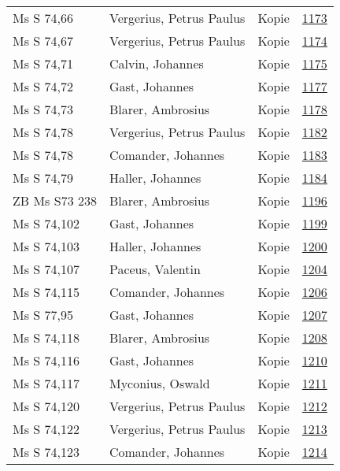 \documentclass[10pt,a4paper,landscape]{report}
\begin{document}
\begin{longtable}{p{16cm}p{4cm}lr}
Ms S 74,66	&	Vergerius, Petrus Paulus	&	Kopie	&	\href{http://130.60.24.72/assignment/1173}{1173}\\
Ms S 74,67	&	Vergerius, Petrus Paulus	&	Kopie	&	\href{http://130.60.24.72/assignment/1174}{1174}\\
Ms S 74,71	&	Calvin, Johannes	&	Kopie	&	\href{http://130.60.24.72/assignment/1175}{1175}\\
Ms S 74,72	&	Gast, Johannes	&	Kopie	&	\href{http://130.60.24.72/assignment/1177}{1177}\\
Ms S 74,73	&	Blarer, Ambrosius	&	Kopie	&	\href{http://130.60.24.72/assignment/1178}{1178}\\
Ms S 74,78	&	Vergerius, Petrus Paulus	&	Kopie	&	\href{http://130.60.24.72/assignment/1182}{1182}\\
Ms S 74,78	&	Comander, Johannes	&	Kopie	&	\href{http://130.60.24.72/assignment/1183}{1183}\\
Ms S 74,79	&	Haller, Johannes	&	Kopie	&	\href{http://130.60.24.72/assignment/1184}{1184}\\
ZB Ms S73 238	&	Blarer, Ambrosius	&	Kopie	&	\href{http://130.60.24.72/assignment/1196}{1196}\\
Ms S 74,102	&	Gast, Johannes	&	Kopie	&	\href{http://130.60.24.72/assignment/1199}{1199}\\
Ms S 74,103	&	Haller, Johannes	&	Kopie	&	\href{http://130.60.24.72/assignment/1200}{1200}\\
Ms S 74,107	&	Paceus, Valentin	&	Kopie	&	\href{http://130.60.24.72/assignment/1204}{1204}\\
Ms S 74,115	&	Comander, Johannes	&	Kopie	&	\href{http://130.60.24.72/assignment/1206}{1206}\\
Ms S 77,95	&	Gast, Johannes	&	Kopie	&	\href{http://130.60.24.72/assignment/1207}{1207}\\
Ms S 74,118	&	Blarer, Ambrosius	&	Kopie	&	\href{http://130.60.24.72/assignment/1208}{1208}\\
Ms S 74,116	&	Gast, Johannes	&	Kopie	&	\href{http://130.60.24.72/assignment/1210}{1210}\\
Ms S 74,117	&	Myconius, Oswald	&	Kopie	&	\href{http://130.60.24.72/assignment/1211}{1211}\\
Ms S 74,120	&	Vergerius, Petrus Paulus	&	Kopie	&	\href{http://130.60.24.72/assignment/1212}{1212}\\
Ms S 74,122	&	Vergerius, Petrus Paulus	&	Kopie	&	\href{http://130.60.24.72/assignment/1213}{1213}\\
Ms S 74,123	&	Comander, Johannes	&	Kopie	&	\href{http://130.60.24.72/assignment/1214}{1214}\\

\end{longtable}
\end{document}
